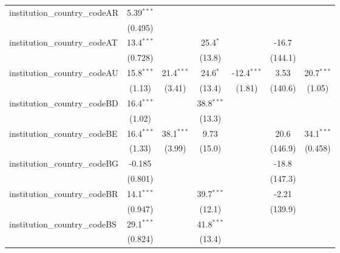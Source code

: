 \begin{tabular}{lcccccc}
   institution\_country\_codeAR          & 5.39$^{***}$  &              &              &               &               &   \\   
                                         & (0.495)       &              &              &               &               &   \\   
   institution\_country\_codeAT          & 13.4$^{***}$  &              & 25.4$^{*}$   &               & -16.7         &   \\   
                                         & (0.728)       &              & (13.8)       &               & (144.1)       &   \\   
   institution\_country\_codeAU          & 15.8$^{***}$  & 21.4$^{***}$ & 24.6$^{*}$   & -12.4$^{***}$ & 3.53          & 20.7$^{***}$\\   
                                         & (1.13)        & (3.41)       & (13.4)       & (1.81)        & (140.6)       & (1.05)\\   
   institution\_country\_codeBD          & 16.4$^{***}$  &              & 38.8$^{***}$ &               &               &   \\   
                                         & (1.02)        &              & (13.3)       &               &               &   \\   
   institution\_country\_codeBE          & 16.4$^{***}$  & 38.1$^{***}$ & 9.73         &               & 20.6          & 34.1$^{***}$\\   
                                         & (1.33)        & (3.99)       & (15.0)       &               & (146.9)       & (0.458)\\   
   institution\_country\_codeBG          & -0.185        &              &              &               & -18.8         &   \\   
                                         & (0.801)       &              &              &               & (147.3)       &   \\   
   institution\_country\_codeBR          & 14.1$^{***}$  &              & 39.7$^{***}$ &               & -2.21         &   \\   
                                         & (0.947)       &              & (12.1)       &               & (139.9)       &   \\   
   institution\_country\_codeBS          & 29.1$^{***}$  &              & 41.8$^{***}$ &               &               &   \\   
                                         & (0.824)       &              & (13.4)       &               &               &   \\   

\end{tabular}
